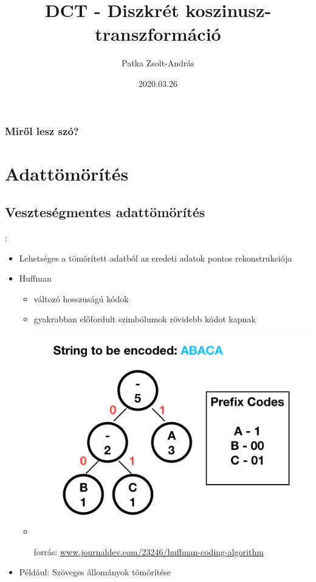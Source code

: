 \documentclass{beamer}
\title{DCT - Diszkrét koszinusz-transzformáció}
\author{Patka Zsolt-András}
\institute{Sapientia EMTE - Számítástechnika IV}
\date{2020.03.26}
\begin{document}
\begin{frame}
    \titlepage
\end{frame}

\begin{frame}
\frametitle{Miről lesz szó?}
\tableofcontents
\end{frame}

\section{Adattömörítés}

\subsection{Veszteségmentes adattömörítés}
\begin{frame}{\secname : \subsecname}
\begin{itemize}
    \item Lehetséges a tömörített adatból az eredeti adatok pontos rekonstrukciója
    \item Huffman
    \begin{itemize}
    \item változó hosszuságú kódok
    \item gyakrabban előfordult szimbólumok rövidebb kódot kapnak
    \item \includegraphics[scale=0.3]{figures/huffman.png} 
    \begin{footnotesize}
        forrás: \url{www.journaldev.com/23246/huffman-coding-algorithm}
        \end{footnotesize}
    \end{itemize}
    \item Például: Szöveges állományok tömörítése
\end{itemize}    
\end{frame}
\end{document}
